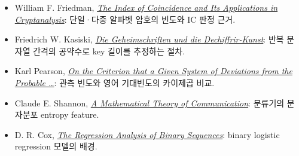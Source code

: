 \documentclass[10pt,a4paper]{article}
\begin{document}
\begin{itemize}
  \item William F. Friedman,
    \href{https://www.nsa.gov/Portals/75/documents/news-features/declassified-documents/friedman-documents/publications/FOLDER_233/41761039080018.pdf}
    {\emph{The Index of Coincidence and Its Applications in Cryptanalysis}}:
    단일·다중 알파벳 암호의 빈도와 IC 판정 근거.
  \item Friedrich W. Kasiski,
    \href{https://books.google.de/books?id=fB5dAAAAcAAJ}
    {\emph{Die Geheimschriften und die Dechiffrir-Kunst}}:
    반복 문자열 간격의 공약수로 key 길이를 추정하는 절차.
  \item Karl Pearson,
    \href{https://doi.org/10.1080/14786440009463897}
    {\emph{On the Criterion that a Given System of Deviations from the
    Probable \ldots}}: 관측 빈도와 영어 기대빈도의 카이제곱 비교.
  \item Claude E. Shannon,
    \href{https://doi.org/10.1002/j.1538-7305.1948.tb01338.x}
    {\emph{A Mathematical Theory of Communication}}:
    분류기의 문자분포 entropy feature.
  \item D. R. Cox,
    \href{https://doi.org/10.1111/j.2517-6161.1958.tb00292.x}
    {\emph{The Regression Analysis of Binary Sequences}}:
    binary logistic regression 모델의 배경.
\end{itemize}
\end{document}
